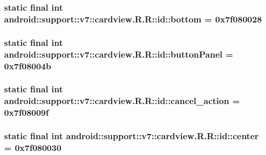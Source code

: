 \hypertarget{classandroid_1_1support_1_1v7_1_1cardview_1_1_r_1_1id_b5fb5a297102a01d1996e2c058e41f46}{
\subsubsection[{bottom}]{\setlength{\rightskip}{0pt plus 5cm}static final int android::support::v7::cardview.R.R::id::bottom = 0x7f080028}}
\label{classandroid_1_1support_1_1v7_1_1cardview_1_1_r_1_1id_b5fb5a297102a01d1996e2c058e41f46}


\hypertarget{classandroid_1_1support_1_1v7_1_1cardview_1_1_r_1_1id_8115426caaba59e2fa58f1a757edf086}{
\subsubsection[{buttonPanel}]{\setlength{\rightskip}{0pt plus 5cm}static final int android::support::v7::cardview.R.R::id::buttonPanel = 0x7f08004b}}
\label{classandroid_1_1support_1_1v7_1_1cardview_1_1_r_1_1id_8115426caaba59e2fa58f1a757edf086}


\hypertarget{classandroid_1_1support_1_1v7_1_1cardview_1_1_r_1_1id_35304e86177be1865f6a1811bd155b37}{
\subsubsection[{cancel\_\-action}]{\setlength{\rightskip}{0pt plus 5cm}static final int android::support::v7::cardview.R.R::id::cancel\_\-action = 0x7f08009f}}
\label{classandroid_1_1support_1_1v7_1_1cardview_1_1_r_1_1id_35304e86177be1865f6a1811bd155b37}


\hypertarget{classandroid_1_1support_1_1v7_1_1cardview_1_1_r_1_1id_1c84b5ec713ff3803c62f03338ef0d6d}{
\subsubsection[{center}]{\setlength{\rightskip}{0pt plus 5cm}static final int android::support::v7::cardview.R.R::id::center = 0x7f080030}}
\label{classandroid_1_1support_1_1v7_1_1cardview_1_1_r_1_1id_1c84b5ec713ff3803c62f03338ef0d6d}


